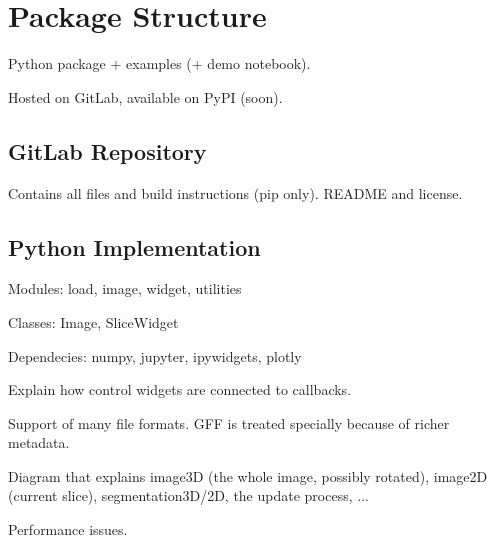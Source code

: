 \chapter{Package Structure}

Python package + examples (+ demo notebook).

Hosted on GitLab, available on PyPI (soon).

\section{GitLab Repository}

Contains all files and build instructions (pip only). README and license.

\section{Python Implementation}

Modules: load, image, widget, utilities

Classes: Image, SliceWidget

Dependecies: numpy, jupyter, ipywidgets, plotly

Explain how control widgets are connected to callbacks.

Support of many file formats. GFF is treated specially because of richer metadata.

Diagram that explains image3D (the whole image, possibly rotated), image2D (current slice), segmentation3D/2D, the update process, ...

Performance issues.